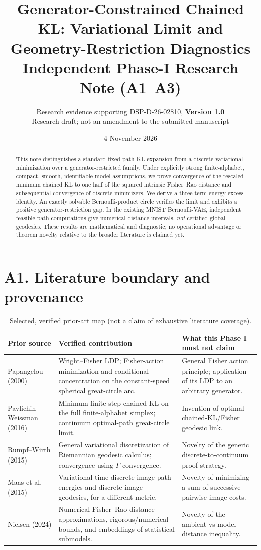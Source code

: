 \documentclass[10pt,a4paper]{article}
\title{Generator-Constrained Chained KL: Variational Limit and Geometry-Restriction Diagnostics\\\large Independent Phase-I Research Note (A1--A3)}
\author{Research evidence supporting DSP-D-26-02810, \textbf{Version 1.0}\\\small Research draft; not an amendment to the submitted manuscript}
\date{4 November 2026}
\begin{document}
\maketitle
\begin{abstract}
This note distinguishes a standard fixed-path KL expansion from a discrete variational minimization over a generator-restricted family. Under explicitly strong finite-alphabet, compact, smooth, identifiable-model assumptions, we prove convergence of the rescaled minimum chained KL to one half of the squared intrinsic Fisher--Rao distance and subsequential convergence of discrete minimizers. We derive a three-term energy-excess identity. An exactly solvable Bernoulli-product circle verifies the limit and exhibits a positive generator-restriction gap. In the existing MNIST Bernoulli-VAE, independent feasible-path computations give numerical distance intervals, \emph{not} certified global geodesics. These results are mathematical and diagnostic; no operational advantage or theorem novelty relative to the broader literature is claimed yet.
\end{abstract}

\section{A1. Literature boundary and provenance}
\begin{table}[h!]
\centering\small
\begin{tabular}{p{3.1cm}p{6.15cm}p{4.0cm}}
\toprule
Prior source & Verified contribution & What this Phase I must not claim \\
\midrule
Papangelou (2000) \cite{papangelou} & Wright--Fisher LDP; Fisher-action minimization and conditional concentration on the constant-speed spherical great-circle arc. & General Fisher action principle; application of its LDP to an arbitrary generator.\\
Pavlichin--Weissman (2016) \cite{pavlichin} & Minimum finite-step chained KL on the full finite-alphabet simplex; continuum optimal-path great-circle limit. & Invention of optimal chained-KL/Fisher geodesic link.\\
Rumpf--Wirth (2015) \cite{rumpf} & General variational discretization of Riemannian geodesic calculus; convergence using $\Gamma$-convergence. & Novelty of the generic discrete-to-continuum proof strategy.\\
Maas et al. (2015) \cite{maas} & Variational time-discrete image-path energies and discrete image geodesics, for a different metric. & Novelty of minimizing a sum of successive pairwise image costs.\\
Nielsen (2024) \cite{nielsen} & Numerical Fisher--Rao distance approximations, rigorous/numerical bounds, and embeddings of statistical submodels. & Novelty of the ambient-vs-model distance inequality.\\
\bottomrule
\end{tabular}
\caption{Selected, verified prior-art map (not a claim of exhaustive literature coverage).}\label{tab:prior}
\end{table}
\end{document}
